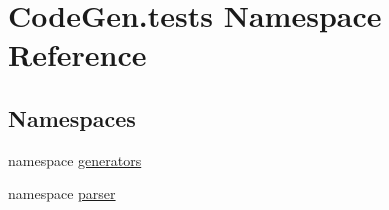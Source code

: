 \hypertarget{namespaceCodeGen_1_1tests}{}\section{Code\+Gen.\+tests Namespace Reference}
\label{namespaceCodeGen_1_1tests}
\subsection*{Namespaces}
\begin{DoxyCompactItemize}
\item 
namespace \mbox{\hyperlink{namespaceCodeGen_1_1tests_1_1generators}{generators}}
\item 
namespace \mbox{\hyperlink{namespaceCodeGen_1_1tests_1_1parser}{parser}}
\end{DoxyCompactItemize}

